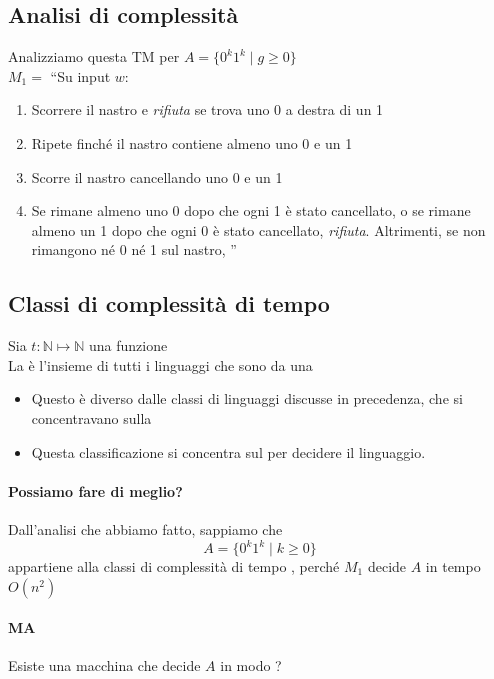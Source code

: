 \subsection{Analisi di complessità}
Analizziamo questa TM per $A=\{0^k1^k\mid g\geq 0\}$\\
$M_1 =$ ``Su input $w$:
\begin{enumerate}
  \item Scorrere il nastro e \textit{rifiuta} se trova uno 0 a destra di un 1
  \item Ripete finché il nastro contiene almeno uno 0 e un 1
  \item Scorre il nastro cancellando uno 0 e un 1
  \item Se rimane almeno uno 0 dopo che ogni 1 è stato cancellato, 
    o se rimane almeno un 1 dopo che ogni 0 è stato cancellato, \textit{rifiuta}. 
    Altrimenti, se non rimangono né 0 né 1 sul nastro, ''
\end{enumerate}
\subsection{Classi di complessità di tempo}
\begin{definition}
  Sia $t:\mathbb{N}\mapsto\mathbb{N}$ una funzione\\
  La  è l'insieme di tutti i 
  linguaggi che sono  da una 
  \begin{itemize}
    \item Questo è diverso dalle classi di linguaggi discusse in precedenza, 
      che si concentravano sulla 
    \item Questa classificazione si concentra sul 
      per decidere il linguaggio.
  \end{itemize}
\end{definition}
\paragraph{Possiamo fare di meglio?} Dall'analisi che abbiamo fatto, sappiamo che 
$$ A=\{0^k1^k\mid k\geq 0\}$$
appartiene alla classi di complessità di tempo , perché $M_1$ 
decide $A$ in tempo $O(n^2)$
\paragraph{MA} Esiste una macchina che decide $A$ in modo ?
